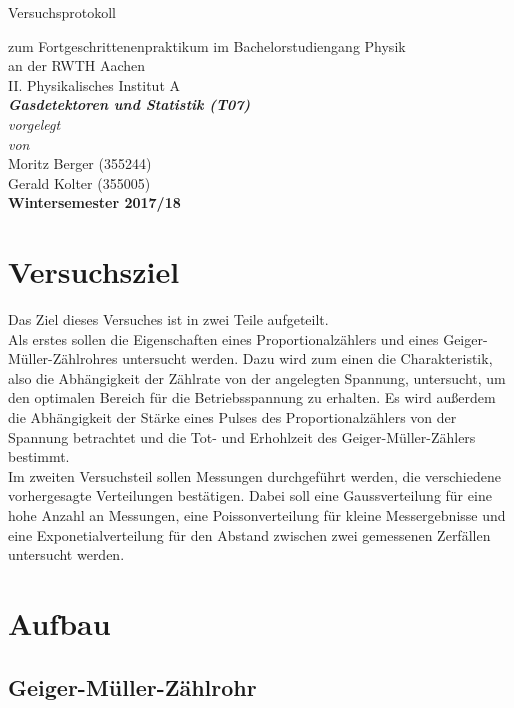 \documentclass[12pt,a4paper]{article}
\author{Gerald}
\begin{document}
	\setlength{\parindent}{0pt} 
	\begin{center}
		{\LARGE Versuchsprotokoll}\\
		\begin{large}
			zum Fortgeschrittenenpraktikum im Bachelorstudiengang Physik\\[0.4cm]
			an der RWTH Aachen\\
			II. Physikalisches Institut A\\[5.5cm]
			\Large\textbf{\textsl{Gasdetektoren und Statistik (T07)}}\\[5.5cm]
			\normalsize\textit{vorgelegt\\von}\\[0.4cm]
			\large{Moritz Berger (355244)\\Gerald Kolter (355005)}\\[2cm]
			\large \textbf{Wintersemester 2017/18}
		\end{large}
	\end{center}
	\newpage
	
	\tableofcontents
	\newpage
	
	
\section{Versuchsziel}
Das Ziel dieses Versuches ist in zwei Teile aufgeteilt.\\
Als erstes sollen die Eigenschaften eines Proportionalzählers und eines Geiger-Müller-Zählrohres untersucht werden. Dazu wird zum einen die Charakteristik, also die Abhängigkeit der Zählrate von der angelegten Spannung, untersucht, um den optimalen Bereich für die Betriebsspannung zu erhalten. Es wird außerdem die Abhängigkeit der Stärke eines Pulses des Proportionalzählers von der Spannung betrachtet und die Tot- und  Erhohlzeit des Geiger-Müller-Zählers bestimmt.\\
Im zweiten Versuchsteil sollen Messungen durchgeführt werden, die verschiedene vorhergesagte Verteilungen bestätigen. Dabei soll eine Gaussverteilung für eine hohe Anzahl an Messungen, eine Poissonverteilung für kleine Messergebnisse und eine Exponetialverteilung für den Abstand zwischen zwei gemessenen Zerfällen untersucht werden. 
\section{Aufbau}
\subsection{Geiger-Müller-Zählrohr}
\end{document}
